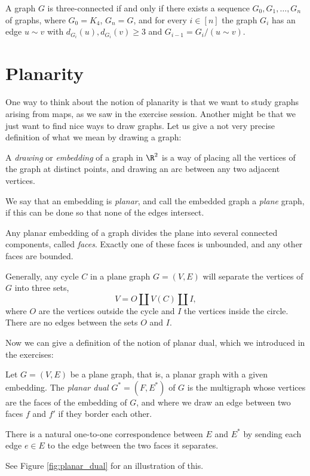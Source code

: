 \documentclass[nobib]{tufte-handout}
\begin{document}
\begin{theorem}[Tutte, 1961]
  A graph $G$ is three-connected if and only if there exists a sequence $G_0, G_1,\ldots, G_n$ of graphs, where $G_0 = K_4$, $G_n = G$, and for every $i \in [n]$ the graph $G_i$ has an edge $u \sim v$ with $d_{G_i}(u), d_{G_i}(v) \geq 3$ and $G_{i-1} = G_i/(u\sim v)$.
\end{theorem}

\section{Planarity}

One way to think about the notion of planarity is that we want to study graphs arising from maps, as we saw in the exercise session. Another might be that we just want to find nice ways to draw graphs. Let us give a not very precise definition of what we mean by drawing a graph:

\begin{definition}
  A \emph{drawing} or \emph{embedding} of a graph in $\R^2$ is a way of placing all the vertices of the graph at distinct points, and drawing an arc between any two adjacent vertices.

  We say that an embedding is \emph{planar}, and call the embedded graph a \emph{plane} graph, if this can be done so that none of the edges intersect.
\end{definition}

\begin{definition}
  Any planar embedding of a graph divides the plane into several connected components, called \emph{faces}. Exactly one of these faces is unbounded, and any other faces are bounded.

  Generally, any cycle $C$ in a plane graph $G = (V,E)$ will separate the vertices of $G$ into three sets,
  $$V = O \amalg V(C) \amalg I,$$
  where $O$ are the vertices outside the cycle and $I$ the vertices inside the circle. There are no edges between the sets $O$ and $I$.
\end{definition}

Now we can give a definition of the notion of planar dual, which we introduced in the exercises:

\begin{definition}
  Let $G = (V,E)$ be a plane graph, that is, a planar graph with a given embedding. The \emph{planar dual} $G^* = (F, E^*)$ of $G$ is the multigraph whose vertices are the faces of the embedding of $G$, and where we draw an edge between two faces $f$ and $f'$ if they border each other.

  There is a natural one-to-one correspondence between $E$ and $E^*$ by sending each edge $e\in E$ to the edge between the two faces it separates.

  See Figure \ref{fig:planar_dual} for an illustration of this.
\end{definition}
\end{document}
